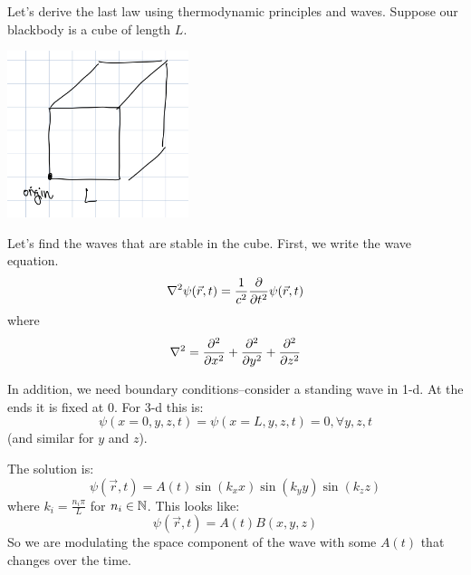 Let's derive the last law using thermodynamic principles and waves. Suppose our blackbody is a cube of length $L$.
\begin{center}
    \includegraphics[width=200px]{../images/L_cube.jpeg}
\end{center}
Let's find the waves that are stable in the cube.
First, we write the wave equation.
\[ \nabla^2 \psi(\vec{r}, t) = \frac{1}{c^2} \partialderivative{}{t^2} \psi(\vec{r}, t) \]
where
\[ \nabla^2 = \partialderivative{^2}{x^2} + \partialderivative{^2}{y^2} + \partialderivative{^2}{z^2} \]

In addition, we need boundary conditions--consider a standing wave in 1-d. At the ends it is fixed at 0. For 3-d this is:
\[ \psi(x = 0, y, z, t) = \psi(x = L, y, z, t) = 0, \forall y, z, t \]
(and similar for $y$ and $z$).

The solution is:
\[ \psi(\vec{r}, t) = A(t) \sin(k_x x) \sin(k_y y) \sin(k_z z) \]
where $k_i = \frac{n_i \pi }{L}$ for $n_i \in \operatorname{\mathbb{N}}$. This looks like:
\[ \psi(\vec{r}, t) = A(t) B(x, y, z) \]
So we are modulating the space component of the wave with some $A(t)$ that changes over the time.